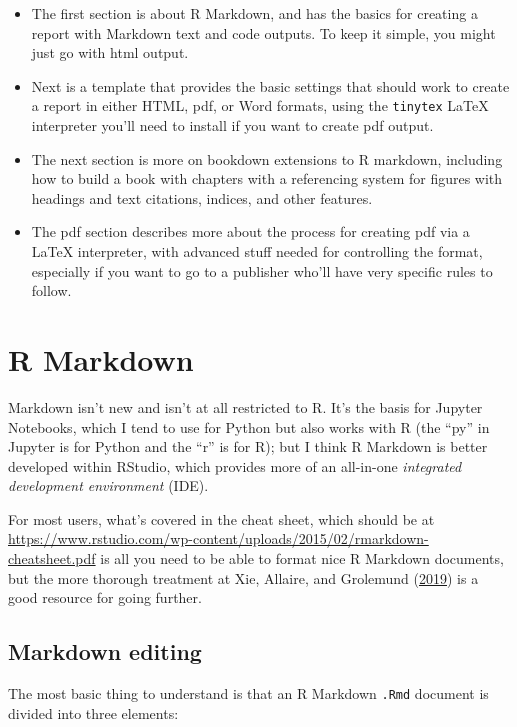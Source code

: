\documentclass[
]{book}
\providecommand{\tightlist}{%
  \setlength{\itemsep}{0pt}\setlength{\parskip}{0pt}}
\begin{document}
\begin{itemize}
\tightlist
\item
  The first section is about R Markdown, and has the basics for creating a report with Markdown text and code outputs. To keep it simple, you might just go with html output.
\item
  Next is a template that provides the basic settings that should work to create a report in either HTML, pdf, or Word formats, using the \texttt{tinytex} LaTeX interpreter you'll need to install if you want to create pdf output.
\item
  The next section is more on bookdown extensions to R markdown, including how to build a book with chapters with a referencing system for figures with headings and text citations, indices, and other features.\\
\item
  The pdf section describes more about the process for creating pdf via a LaTeX interpreter, with advanced stuff needed for controlling the format, especially if you want to go to a publisher who'll have very specific rules to follow.
\end{itemize}

\hypertarget{r-markdown}{%
\section{R Markdown}\label{r-markdown}}

Markdown isn't new and isn't at all restricted to R. It's the basis for Jupyter Notebooks, which I tend to use for Python but also works with R (the ``py'' in Jupyter is for Python and the ``r'' is for R); but I think R Markdown is better developed within RStudio, which provides more of an all-in-one \emph{integrated development environment} (IDE).

For most users, what's covered in the cheat sheet, which should be at \url{https://www.rstudio.com/wp-content/uploads/2015/02/rmarkdown-cheatsheet.pdf} is all you need to be able to format nice R Markdown documents, but the more thorough treatment at Xie, Allaire, and Grolemund (\protect\hyperlink{ref-RMarkdown}{2019}) is a good resource for going further.

\hypertarget{markdown-editing}{%
\subsection{Markdown editing}\label{markdown-editing}}

The most basic thing to understand is that an R Markdown \texttt{.Rmd} document is divided into three elements:
\end{document}

